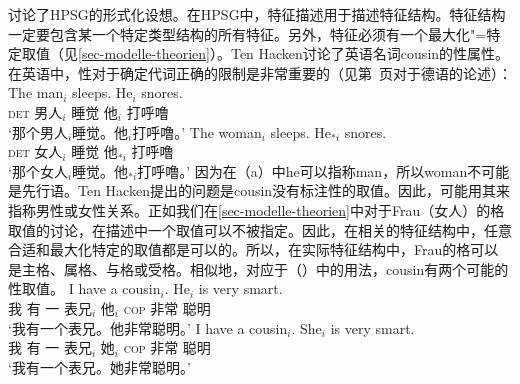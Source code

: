 \mbox{}讨论了HPSG\indexhpsgc 的形式化设想。在HPSG中，特征描述用于描述特征结构。特征结构一定要包含某一个特定类型结构的所有特征。另外，特征必须有一个最大化"=特定取值（见\ref{sec-modelle-theorien}）。Ten Hacken讨论了英语名词cousin的性属性。在英语中，性对于确定代词正确的限制是非常重要的（见第~\pageref{le-buch}页对于德语的论述）：
\eal
\ex 
\gll The man$_i$ sleeps. He$_i$ snores.\\
	 \textsc{det} 男人$_i$ 睡觉 他$_i$  打呼噜\\
\glt `那个男人$_i$睡觉。他$_i$打呼噜。'
\ex 
\gll The woman$_i$ sleeps. He$_{*i}$ snores.\\
	 \textsc{det} 女人$_i$ 睡觉 他$_{*i}$  打呼噜\\
\glt `那个女人$_i$睡觉。他$_{*i}$打呼噜。'
\zl
因为在（a）中he可以指称man，所以woman不可能是先行语。Ten Hacken提出的问题是cousin没有标注性的取值。因此，可能用其来指称男性或女性关系。正如我们在\ref{sec-modelle-theorien}中对于Frau（女人）的格取值的讨论，在描述中一个取值可以不被指定。因此，在相关的特征结构中，任意合适和最大化特定的取值都是可以的。所以，在实际特征结构中，Frau的格可以是主格、属格、与格或受格。相似地，对应于（）中的用法，cousin有两个可能的性取值。
\eal
\ex 
\gll I have a cousin$_i$. He$_i$ is very smart.\\
	 我 有 一 表兄$_i$ 他$_i$ \textsc{cop} 非常 聪明\\
\glt `我有一个表兄。他非常聪明。'
\ex 
\gll I have a cousin$_i$. She$_i$ is very smart.\\
	 我 有 一 表兄$_i$ 她$_i$ \textsc{cop} 非常 聪明\\
\glt `我有一个表兄。她非常聪明。'
\zl

